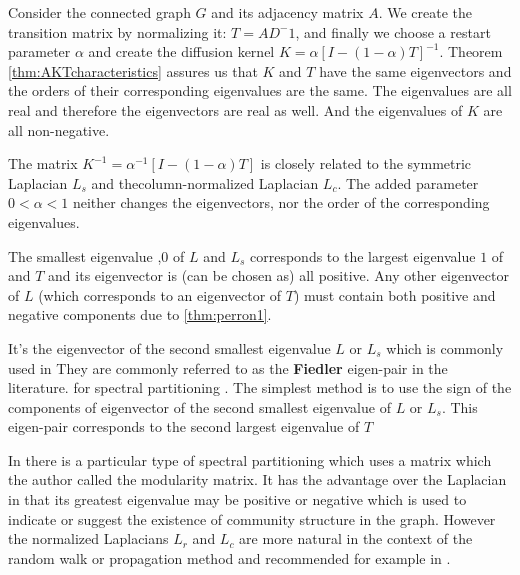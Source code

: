 \documentclass[a4paper,10pt]{article}
\newcommand{\lt}{<}
\theoremstyle{definition}
\theoremstyle{remark}
\theoremstyle{plain}
\begin{document}
Consider the connected graph $G$ and its adjacency matrix $A$. We create the transition
matrix by normalizing it: $T = AD^-1$, and finally we choose a restart parameter
$\alpha$ and create the diffusion kernel $K = \alpha[I - (1 -
\alpha) T]^{-1}$. Theorem
\ref{thm:AKTcharacteristics} assures us that $K$ and $T$ have the same
eigenvectors and the orders of their corresponding eigenvalues are the same. The
eigenvalues are all real and therefore the eigenvectors are real as well. And
the eigenvalues of $K$ are all non-negative.

The matrix $K^{-1} = \alpha^{-1} [I - (1- \alpha) T]$ is closely related to the
symmetric Laplacian $L_s$ and thecolumn-normalized Laplacian $L_c$. The added parameter $0 \lt \alpha \lt 1$
neither changes the eigenvectors, nor the order of the corresponding eigenvalues.

The smallest eigenvalue ,$0$ of $L$ and $L_s$
corresponds to the largest eigenvalue $1$ of and $T$ and its eigenvector is
(can be chosen as) all positive. 
Any other eigenvector of $L$ (which corresponds to an eigenvector of $T$) must
contain both positive and negative components due to \ref{thm:perron1}.

It's the eigenvector of the second smallest
eigenvalue $L$ or $L_s$ which is commonly used in 
They are commonly referred to as the \textbf{Fiedler} eigen-pair in the literature.
for spectral partitioning \cite{naumov2016parallel}. The simplest method is to
use the sign of the components of
eigenvector of the second smallest eigenvalue of $L$ or $L_s$.
This eigen-pair corresponds to the second largest eigenvalue of $T$

In \textcite{newman2006modularity} there is a particular type of spectral
partitioning which uses a matrix which the author called the modularity matrix.
It has the advantage over the Laplacian in that its greatest eigenvalue may be
positive or negative which is used to indicate or suggest the existence of
community structure in the graph. However the normalized Laplacians $L_r$ and
$L_c$ are more natural in the context of the random walk or propagation method
and recommended for example in \cite{von2007tutorial}.
\end{document}
